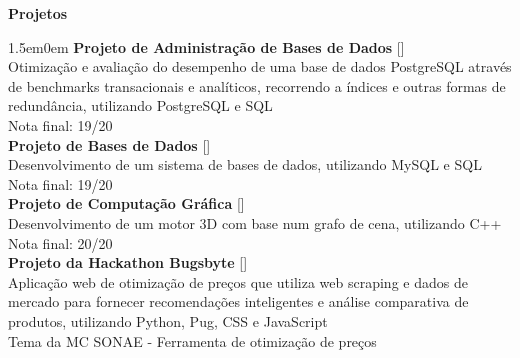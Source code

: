 \noindent\textbf{Projetos}
\noindent\hrulefill
\vspace{0.25em}
\begin{adjustwidth}{1.5em}{0em}
\textbf{Projeto de Administração de Bases de Dados} \hfill [\href{https://github.com/a104437ana/ABD}{\faGithub}] \\
Otimização e avaliação do desempenho de uma base de dados PostgreSQL através de benchmarks transacionais e analíticos, recorrendo a índices e outras formas de redundância, utilizando PostgreSQL e SQL\\
Nota final: 19/20
\vspace{0.5em}
\\
\textbf{Projeto de Bases de Dados} \hfill [\href{https://github.com/a104437ana/BD}{\faGithub}] \\
Desenvolvimento de um sistema de bases de dados, utilizando MySQL e SQL\\
Nota final: 19/20
\vspace{0.5em}
\\
\textbf{Projeto de Computação Gráfica} \hfill [\href{https://github.com/a104437ana/CG}{\faGithub}] \\
Desenvolvimento de um motor 3D com base num grafo de cena, utilizando C++\\
Nota final: 20/20
\vspace{0.5em}
\\
\textbf{Projeto da Hackathon Bugsbyte} \hfill [\href{https://github.com/a104437ana/HACKATHON-BUGSBYTE-2025}{\faGithub}] \\
Aplicação web de otimização de preços que utiliza web scraping e dados de mercado para fornecer recomendações inteligentes e análise comparativa de produtos, utilizando Python, Pug, CSS e JavaScript\\
Tema da MC SONAE - Ferramenta de otimização de preços
\end{adjustwidth}
\vspace{0.25em}
